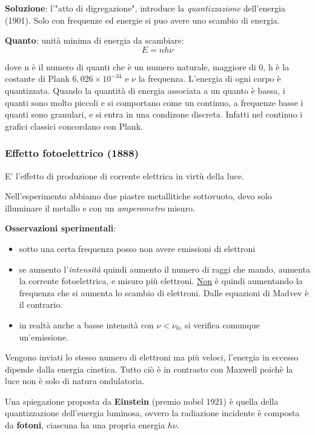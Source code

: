 \textbf{Soluzione}: l'"atto di digregazione", introduce la \emph{quantizzazione} dell'energia (1901). Solo con frequenze ed energie si puo avere uno scambio di energia. %

\textbf{Quanto}: unità minima di energia da scambiare: 
\[ E=n h \nu\] 

dove n è il numero di quanti che è un numero naturale, maggiore di 0, h è la costante di Plank $6,026\times10^{-34}$ e $\nu$ la frequenza. 
L'energia di ogni corpo è quantizzata.
Quando la quantità di energia associata a un quanto è bassa, i quanti sono molto piccoli e si comportano come un continuo, a frequenze basse i quanti sono granulari, e si entra in una condizone discreta. Infatti nel continuo i grafici classici concordano con Plank. 

\subsubsection{Effetto fotoelettrico (1888) }
E' l'effetto di produzione di corrente elettrica in virtù della luce. 

Nell'esperimento abbiamo due piastre metallitiche sottovuoto, devo solo illuminare il metallo e con un \emph{amperometro} misuro. 

\textbf{Osservazioni sperimentali}: 
\begin{itemize}
    \item sotto una certa frequenza posso non avere emissioni di elettroni
    \item se aumento l'\emph{intensità} quindi aumento il numero di raggi che mando, aumenta la corrente fotoelettrica, e misuro più elettroni. \underline{Non} è quindi aumentando la frequenza che si aumenta lo scambio di elettroni. Dalle equazioni di Madvev è il contrario.
    \item in realtà anche a basse intensità con $\nu<\nu_0$, si verifica comunque un'emissione.
\end{itemize}


Vengono inviati lo stesso numero di elettroni ma più veloci, l'energia in eccesso dipende dalla energia cinetica. Tutto ciò è in contrasto con Maxwell poichè la luce non è solo di natura ondulatoria. 

Una spiegazione proposta da \textbf{Einstein} (premio nobel 1921) è quella della quantizzazione dell'energia luminosa, ovvero la radiazione incidente è composta da \textbf{fotoni}, ciascuna ha una propria energia $h\nu$. 

